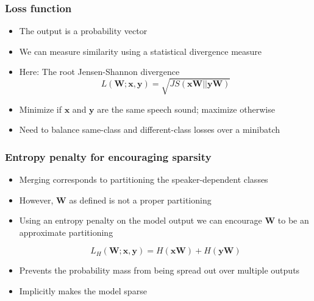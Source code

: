 \documentclass[british]{beamer}
\begin{document}
  \begin{frame}
    \frametitle{Loss function}
    
    \begin{itemize}
     \item The output is a probability vector
     \item We can measure similarity using a statistical divergence measure \pause
     \item Here: The root Jensen-Shannon divergence
    \begin{equation*}
      L(\mathbf W; \mathbf x, \mathbf y) = \sqrt{JS(\mathbf x \mathbf W || \mathbf y \mathbf W)}
    \end{equation*}
     \item Minimize if $\mathbf x$ and $\mathbf y$ are the same speech sound; maximize otherwise \pause
     \item Need to balance same-class and different-class losses over a minibatch
    \end{itemize}
  \end{frame}

  \begin{frame}
    \frametitle{Entropy penalty for encouraging sparsity}
    
    \begin{itemize}
     \item Merging corresponds to partitioning the speaker-dependent classes
     \item However, $\mathbf W$ as defined is not a proper partitioning \pause
     \item Using an entropy penalty on the model output we can encourage $\mathbf W$ to be an approximate partitioning
     
     \begin{equation*}
      L_H(\mathbf W; \mathbf x, \mathbf y) = H(\mathbf x \mathbf W) + H(\mathbf y \mathbf W)
     \end{equation*}
     \item Prevents the probability mass from being spread out over multiple outputs
     \item Implicitly makes the model sparse
    \end{itemize}

  \end{frame}
  
\end{document}
